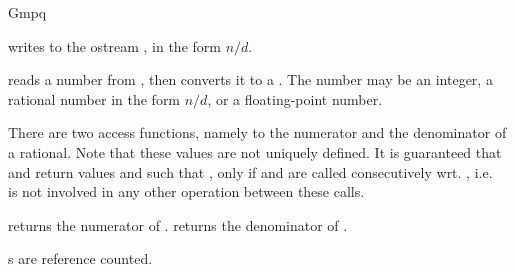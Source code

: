 \begin{ccRefClass} {Gmpq}

\ccOperations
{}
	{writes  to the ostream , in the form $n/d$.}

	{reads a number from , then converts it to a
	. The number may be an integer, a rational number in
	the form $n/d$, or a floating-point number.}

There are two access functions, namely to the
numerator and the denominator of a rational.
Note that these values are not uniquely defined. 
It is guaranteed that  and 
 return values  and
 such that , only
if   and  are called
consecutively wrt. , i.e.~ is not involved in 
any other operation between these calls.

       {returns the numerator of .}
\ccGlue
{}
       {returns the denominator of .}

\ccImplementation
{}s are reference counted.

\end{ccRefClass} 
